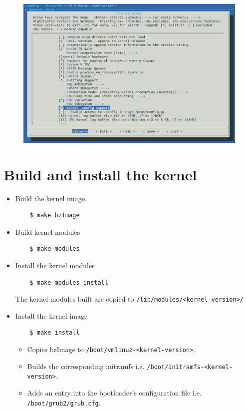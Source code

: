 \documentclass{beamer}
\begin{document}
\begin{frame}
  \begin{figure}[h!]
    \centering
    \includegraphics[scale=0.3]{images/proc-config-3.png}
  \end{figure}
\end{frame}

\section{Build and install the kernel}

\begin{frame}[fragile]
\begin{itemize}
\item Build the kernel image.
  \begin{lstlisting}
    $ make bzImage
  \end{lstlisting}

\item Build kernel modules
  \begin{lstlisting}
    $ make modules
  \end{lstlisting}
  
\item Install the kernel modules
  \begin{lstlisting}
    $ make modules_install
  \end{lstlisting}
  The kernel modules built are copied to {\tiny\texttt{/lib/modules/<kernel-version>/}}

\item Install the kernel image
  \begin{lstlisting}
    $ make install
  \end{lstlisting}
  \begin{itemize}
  \item Copies bzImage to {\tiny \texttt{/boot/vmlinuz-<kernel-version>}}.
  \item Builds the corresponding initramfs
    i.e. {\tiny \texttt{/boot/initramfs-<kernel-version>}}.
  \item Adds an entry into the bootloader's configuration file i.e. {\tiny \texttt{/boot/grub2/grub.cfg}}.
  \end{itemize}
\end{itemize}
\end{frame}
\end{document}
